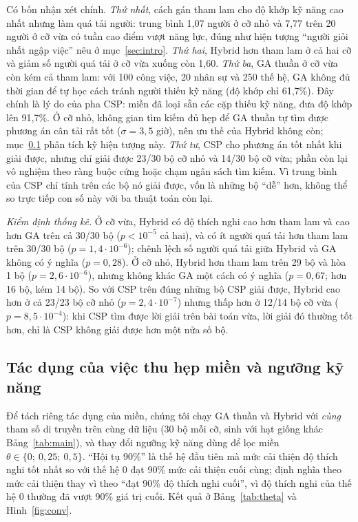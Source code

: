 \documentclass{IEEEtran}
\begin{document}
Có bốn nhận xét chính. \emph{Thứ nhất}, cách gán tham lam cho độ khớp kỹ năng cao nhất nhưng làm quá tải người: trung bình 1,07 người ở cỡ nhỏ và 7,77 trên 20 người ở cỡ vừa có tuần cao điểm vượt năng lực, đúng như hiện tượng ``người giỏi nhất ngập việc'' nêu ở mục~\ref{sec:intro}. \emph{Thứ hai}, Hybrid hơn tham lam ở cả hai cỡ và giảm số người quá tải ở cỡ vừa xuống còn 1,60. \emph{Thứ ba}, GA thuần ở cỡ vừa còn kém cả tham lam: với 100 công việc, 20 nhân sự và 250 thế hệ, GA không đủ thời gian để tự học cách tránh người thiếu kỹ năng (độ khớp chỉ 61,7\%). Đây chính là lý do của pha CSP: miền đã loại sẵn các cặp thiếu kỹ năng, đưa độ khớp lên 91,7\%. Ở cỡ nhỏ, không gian tìm kiếm đủ hẹp để GA thuần tự tìm được phương án cân tải rất tốt ($\sigma=3{,}5$ giờ), nên ưu thế của Hybrid không còn; mục~\ref{sec:domain} phân tích kỹ hiện tượng này. \emph{Thứ tư}, CSP cho phương án tốt nhất khi giải được, nhưng chỉ giải được 23/30 bộ cỡ nhỏ và 14/30 bộ cỡ vừa; phần còn lại vô nghiệm theo ràng buộc cứng hoặc chạm ngân sách tìm kiếm. Vì trung bình của CSP chỉ tính trên các bộ nó giải được, vốn là những bộ ``dễ'' hơn, không thể so trực tiếp con số này với ba thuật toán còn lại.

\textit{Kiểm định thống kê.} Ở cỡ vừa, Hybrid có độ thích nghi cao hơn tham lam và cao hơn GA trên cả 30/30 bộ ($p<10^{-5}$ cả hai), và có ít người quá tải hơn tham lam trên 30/30 bộ ($p=1{,}4\cdot10^{-6}$); chênh lệch số người quá tải giữa Hybrid và GA không có ý nghĩa ($p=0{,}28$). Ở cỡ nhỏ, Hybrid hơn tham lam trên 29 bộ và hòa 1 bộ ($p=2{,}6\cdot10^{-6}$), nhưng không khác GA một cách có ý nghĩa ($p=0{,}67$; hơn 16 bộ, kém 14 bộ). So với CSP trên đúng những bộ CSP giải được, Hybrid cao hơn ở cả 23/23 bộ cỡ nhỏ ($p=2{,}4\cdot10^{-7}$) nhưng thấp hơn ở 12/14 bộ cỡ vừa ($p=8{,}5\cdot10^{-4}$): khi CSP tìm được lời giải trên bài toán vừa, lời giải đó thường tốt hơn, chỉ là CSP không giải được hơn một nửa số bộ.

\subsection{Tác dụng của việc thu hẹp miền và ngưỡng kỹ năng}
\label{sec:domain}

Để tách riêng tác dụng của miền, chúng tôi chạy GA thuần và Hybrid với \emph{cùng} tham số di truyền trên cùng dữ liệu (30 bộ mỗi cỡ, sinh với hạt giống khác Bảng~\ref{tab:main}), và thay đổi ngưỡng kỹ năng dùng để lọc miền $\theta\in\{0;\ 0{,}25;\ 0{,}5\}$. ``Hội tụ 90\%'' là thế hệ đầu tiên mà mức cải thiện độ thích nghi tốt nhất so với thế hệ 0 đạt 90\% mức cải thiện cuối cùng; định nghĩa theo mức cải thiện thay vì theo ``đạt 90\% độ thích nghi cuối'', vì độ thích nghi của thế hệ 0 thường đã vượt 90\% giá trị cuối. Kết quả ở Bảng~\ref{tab:theta} và Hình~\ref{fig:conv}.
\end{document}
